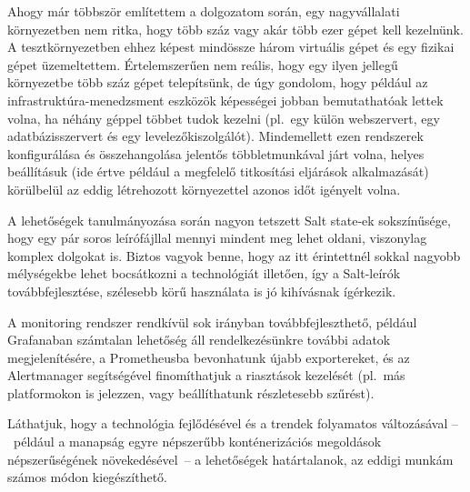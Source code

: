 Ahogy már többször említettem a dolgozatom során, egy nagyvállalati környezetben nem ritka, hogy több száz vagy akár több ezer gépet kell kezelnünk. A tesztkörnyezetben ehhez képest mindössze három virtuális gépet és egy fizikai gépet üzemeltettem. Értelemszerűen nem reális, hogy egy ilyen jellegű környezetbe több száz gépet telepítsünk, de úgy gondolom, hogy például az infrastruktúra-menedzsment eszközök képességei jobban bemutathatóak lettek volna, ha néhány géppel többet tudok kezelni (pl.~egy külön webszervert, egy adatbázisszervert és egy levelezőkiszolgálót). Mindemellett ezen rendszerek konfigurálása és összehangolása jelentős többletmunkával járt volna, helyes beállításuk (ide értve például a megfelelő titkosítási eljárások alkalmazását) körülbelül az eddig létrehozott környezettel azonos időt igényelt volna.

A lehetőségek tanulmányozása során nagyon tetszett Salt state-ek sokszínűsége, hogy egy pár soros leírófájllal mennyi mindent meg lehet oldani, viszonylag komplex dolgokat is. Biztos vagyok benne, hogy az itt érintettnél sokkal nagyobb mélységekbe lehet bocsátkozni a technológiát illetően, így a Salt-leírók továbbfejlesztése, szélesebb körű használata is jó kihívásnak ígérkezik.

A monitoring rendszer rendkívül sok irányban továbbfejleszthető, például Grafanaban számtalan lehetőség áll rendelkezésünkre további adatok megjelenítésére, a Prometheusba bevonhatunk újabb exportereket, és az Alertmanager segítségével finomíthatjuk a riasztások kezelését (pl.~más platformokon is jelezzen, vagy beállíthatunk részletesebb szűrést).

Láthatjuk, hogy a technológia fejlődésével és a trendek folyamatos változásával --~például a manapság egyre népszerűbb konténerizációs megoldások népszerűségének növekedésével~-- a lehetőségek határtalanok, az eddigi munkám számos módon kiegészíthető.